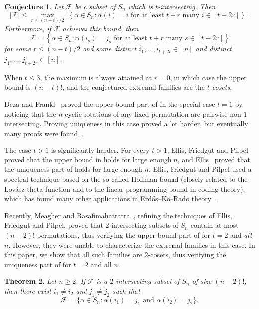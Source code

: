 \documentclass[10pt,a4paper]{amsart}
\newtheorem{theorem}{Theorem}[section]
\newtheorem{conjecture}[theorem]{Conjecture}
\theoremstyle{definition}
\begin{document}
\begin{conjecture} \label{cnj:AK-sym}
Let $\mathcal{F}$ be a subset of $S_n$ which is $t$-intersecting. Then
\[
 |\mathcal{F}| \leq \max_{r \leq (n-t)/2} \left|\left\{ \alpha \in S_n : \alpha(i) = i \text{ for at least } t+r \text{ many } i \in [t+2r] \right\}\right|.
\]
Furthermore, if $\mathcal{F}$ achieves this bound, then
\[
 \mathcal{F} = \left\{ \alpha \in S_n : \alpha(i_s) = j_s \text{ for at least } t+r \text{ many } s \in [t+2r] \right\}
\]
for some $r \leq (n-t)/2$ and some distinct $i_1,\ldots,i_{t+2r} \in [n]$ and distinct $j_1,\ldots,j_{t+2r} \in [n]$.
\end{conjecture}

When $t \leq 3$, the maximum is always attained at $r = 0$, in which case the upper bound is $(n-t)!$, and the conjectured extremal families are the \emph{$t$-cosets}.

Deza and Frankl~\cite{DezaFrankl} proved the upper bound part of  in the special case $t = 1$ by noticing that the $n$ cyclic rotations of any fixed permutation are pairwise non-$1$-intersecting. Proving uniqueness in this case proved a lot harder, but eventually many proofs were found~\cite{CameronKu,LaroseMalvenuto,GodsilMeagher,EFP}.

The case $t > 1$ is significantly harder. For every $t > 1$, Ellis, Friedgut and Pilpel~\cite{EFP} proved that the upper bound in  holds for large enough $n$, and Ellis~\cite{EllisCameronKu} proved that the uniqueness part of  holds for large enough $n$. Ellis, Friedgut and Pilpel used a spectral technique based on the so-called Hoffman bound (closely related to the Lov\'asz theta function and to the linear programming bound in coding theory), which has found many other applications in Erd\H{o}s--Ko--Rado theory~\cite{GodsilMeagherBook}.

Recently, Meagher and Razafimahatratra~\cite{MR21}, refining the techniques of Ellis, Friedgut and Pilpel, proved that $2$-intersecting subsets of $S_n$ contain at most $(n-2)!$ permutations, thus verifying the upper bound part of  for $t = 2$ and \emph{all} $n$. However, they were unable to characterize the extremal families in this case. In this paper, we show that all such families are $2$-cosets, thus verifying the uniqueness part of  for $t = 2$ and all $n$.


\begin{theorem} \label{thm:main-sym}
Let $n \geq 2$. If $\mathcal{F}$ is a $2$-intersecting subset of $S_n$ of size $(n-2)!$, then there exist $i_1 \neq i_2$ and $j_1 \neq j_2$ such that
\[
 \mathcal{F} = \{ \alpha \in S_n : \alpha(i_1) = j_1 \text{ and } \alpha(i_2) = j_2 \}.
\]
\end{theorem}
\end{document}
